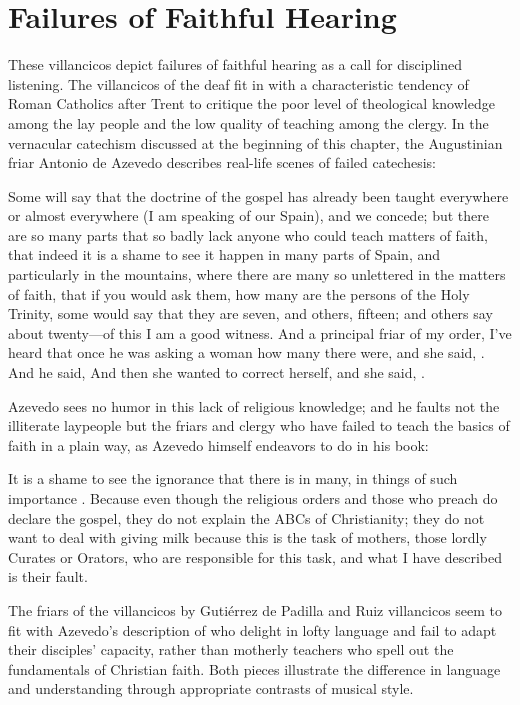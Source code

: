 \section{Failures of Faithful Hearing}

These villancicos depict failures of faithful hearing as a call for disciplined
listening.
The villancicos of the deaf fit in with a characteristic tendency of Roman
Catholics after Trent to critique the poor level of theological knowledge among
the lay people and the low quality of teaching among the clergy.%
    \Autocite[56--57]{Kamen:EarlyModernSociety}
In the vernacular catechism discussed at the beginning of this chapter, the
Augustinian friar Antonio de Azevedo describes real-life scenes of failed
catechesis: 
\begin{quoting}
    Some will say that the doctrine of the gospel has already been taught
    everywhere or almost everywhere (I am speaking of our Spain), and we
    concede; but there are so many parts that so badly lack anyone who could
    teach matters of faith, that indeed it is a shame to see it happen in many
    parts of Spain, and particularly in the mountains, where there are many so
    unlettered  in the matters of faith, that if you would ask
    them, how many are the persons of the Holy Trinity, some would say that they
    are seven, and others, fifteen; and others say about twenty---of this I am a
    good witness.
    And a principal friar of my order, I've heard that once he was asking a
    woman how many  there were, and she said,
    . 
    And he said,  
    And then she wanted to correct herself, and she said, .%
        \Autocite[26]{Azevedo:Catecismo}
\end{quoting}
Azevedo sees no humor in this lack of religious knowledge; and he faults not the
illiterate laypeople but the friars and clergy who have failed to teach the
basics of faith in a plain way, as Azevedo himself endeavors to do in his book:
\begin{quoting}
    It is a shame to see the ignorance that there is in many, in things of such
    importance \Dots{}.
    Because even though the religious orders and those who preach do declare the
    gospel, they do not explain the ABCs  of Christianity;
    they do not want to deal with giving milk because this is the task of
    mothers, those lordly Curates or Orators, who are responsible for this task,
    and what I have described is their fault.%
        \Autocite[27]{Azevedo:Catecismo}
\end{quoting}
The friars of the villancicos by Gutiérrez de Padilla and Ruiz villancicos seem
to fit with Azevedo's description of  who delight in
lofty language and fail to adapt their disciples' capacity, rather than motherly
teachers who spell out the fundamentals of Christian faith.
Both pieces illustrate the difference in language and understanding through
appropriate contrasts of musical style.

